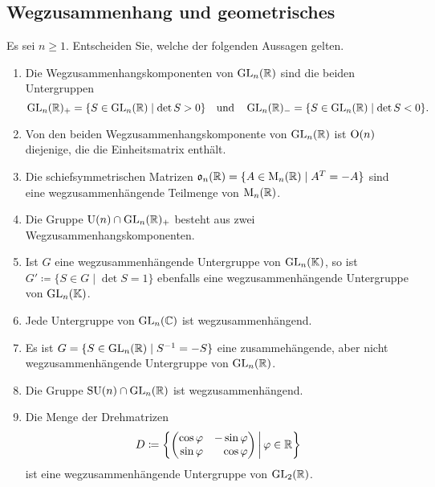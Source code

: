 \subsection{Wegzusammenhang und geometrisches}


\begin{question}
  Es sei $n \geq 1$.
  Entscheiden Sie, welche der folgenden Aussagen gelten.
  \begin{enumerate}[leftmargin=*]
    \item
      Die Wegzusammenhangskomponenten von $\operatorname{GL}_n(\mathbb{R})$ sind die beiden Untergruppen
      \[
        \operatorname{GL}_n(\mathbb{R})_+ = \{ S \in \operatorname{GL}_n(\mathbb{R}) \mid \det S > 0 \}
        \quad\text{und}\quad
        \operatorname{GL}_n(\mathbb{R})_- = \{ S \in \operatorname{GL}_n(\mathbb{R}) \mid \det S < 0 \}.
      \]
    \item
      Von den beiden Wegzusammenhangskomponente von $\operatorname{GL}_n(\mathbb{R})$ ist $\operatorname{O}(n)$ diejenige, die die Einheitsmatrix enthält.
    \item
      Die schiefsymmetrischen Matrizen $\mathfrak{o}_n(\mathbb{R}) = \{ A \in \operatorname{M}_n(\mathbb{R}) \mid A^T = -A \}$ sind eine wegzusammenhängende Teilmenge von $\operatorname{M}_n(\mathbb{R})$.
    \item
      Die Gruppe $\operatorname{U}(n) \cap \operatorname{GL}_n(\mathbb{R})_+$ besteht aus zwei Wegzusammenhangskomponenten.
    \item
      Ist $G$ eine wegzusammenhängende Untergruppe von $\operatorname{GL}_n(\mathbb{K})$, so ist $G' \coloneqq \{ S \in G \mid \det S = 1 \}$ ebenfalls eine wegzusammenhängende Untergruppe von $\operatorname{GL}_n(\mathbb{K})$.
    \item
      Jede Untergruppe von $\operatorname{GL}_n(\mathbb{C})$ ist wegzusammenhängend.
    \item
      Es ist $G = \{ S \in \operatorname{GL}_n(\mathbb{R}) \mid S^{-1} = -S \}$ eine zusammehängende, aber nicht wegzusammenhängende Untergruppe von $\operatorname{GL}_n(\mathbb{R})$.
    \item
      Die Gruppe $\operatorname{SU}(n) \cap \operatorname{GL}_n(\mathbb{R})$ ist wegzusammenhängend.
    \item
      Die Menge der Drehmatrizen
      \[
        D
        \coloneqq
        \left\{
          \begin{pmatrix*}[r]
            \cos \varphi  & -\sin \varphi \\
            \sin \varphi  &  \cos \varphi 
          \end{pmatrix*}
        \,\middle|\,
        \varphi \in \Rbb
        \right\}
      \]
      ist eine wegzusammenhängende Untergruppe von $\operatorname{GL}_2(\mathbb{R})$.
  \end{enumerate}
\end{question}

